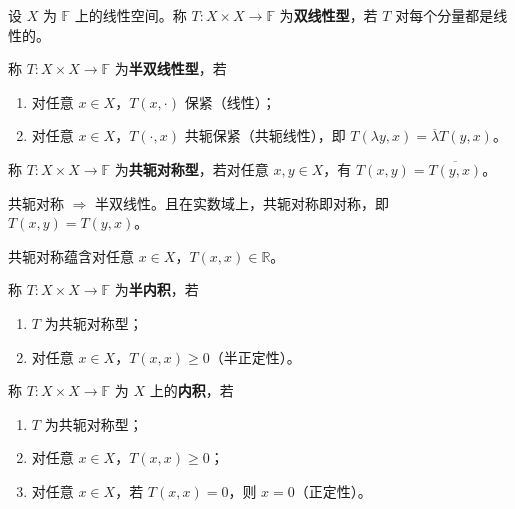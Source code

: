 \documentclass[lang=cn,a4paper,newtx,section]{elegantbook}
\begin{document}
\begin{definition}[双线性型]
  设 $X$ 为 $\mathbb{F}$ 上的线性空间。称 $T:X\times X\to\mathbb{F}$ 为\textbf{双线性型}，若 $T$ 对每个分量都是线性的。
\end{definition}

\begin{definition}[半双线性型]
  称 $T:X\times X\to\mathbb{F}$ 为\textbf{半双线性型}，若
  \begin{enumerate}
    \item 对任意 $x\in X$，$T(x,\cdot)$ 保紧（线性）；
    \item 对任意 $x\in X$，$T(\cdot,x)$ 共轭保紧（共轭线性），即 $T(\lambda y,x)=\overline{\lambda}T(y,x)$。
  \end{enumerate}
\end{definition}

\begin{definition}[共轭对称型]
  称 $T:X\times X\to\mathbb{F}$ 为\textbf{共轭对称型}，若对任意 $x,y\in X$，有 $T(x,y)=\overline{T(y,x)}$。
\end{definition}

\begin{remark}
  共轭对称 $\Rightarrow$ 半双线性。且在实数域上，共轭对称即对称，即 $T(x,y)=T(y,x)$。
  
  共轭对称蕴含对任意 $x\in X$，$T(x,x)\in\mathbb{R}$。
\end{remark}

\begin{definition}[半内积]
  称 $T:X\times X\to\mathbb{F}$ 为\textbf{半内积}，若
  \begin{enumerate}
    \item $T$ 为共轭对称型；
    \item 对任意 $x\in X$，$T(x,x)\ge 0$（半正定性）。
  \end{enumerate}
\end{definition}

\begin{definition}[内积]
  称 $T:X\times X\to\mathbb{F}$ 为 $X$ 上的\textbf{内积}，若
  \begin{enumerate}
    \item $T$ 为共轭对称型；
    \item 对任意 $x\in X$，$T(x,x)\ge 0$；
    \item 对任意 $x\in X$，若 $T(x,x)=0$，则 $x=0$（正定性）。
  \end{enumerate}
\end{definition}
\end{document}
